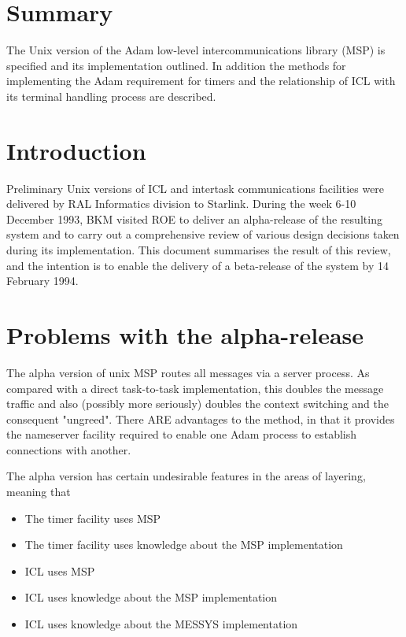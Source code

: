 \section {Summary}

The Unix version of the Adam low-level intercommunications library (MSP) 
is specified and its implementation outlined. In addition the methods 
for implementing the Adam requirement for timers and the relationship of 
ICL with its terminal handling process are described.


\section {Introduction}

Preliminary Unix versions of ICL and intertask communications facilities 
were delivered by RAL Informatics division to Starlink. During the week 
6-10 December 1993, BKM visited ROE to deliver an alpha-release of the 
resulting system and to carry out a comprehensive review of various 
design decisions taken during its implementation. This document 
summarises the result of this review, and the intention is to enable the 
delivery of a beta-release of the system by 14 February 1994.

\section {Problems with the alpha-release}

The alpha version of unix MSP routes all messages via a server process. 
As compared with a direct task-to-task implementation, this doubles the
message traffic and also (possibly more seriously) doubles the context 
switching and the consequent "ungreed". There ARE advantages to the 
method, in that it provides the nameserver facility required to enable 
one Adam process to establish connections with another.

The alpha version has certain undesirable features in the areas of 
layering, meaning that

\begin{itemize}
\item The timer facility uses MSP
\item The timer facility uses knowledge about the MSP implementation
\item ICL uses MSP
\item ICL uses knowledge about the MSP implementation
\item ICL uses knowledge about the MESSYS implementation
\end{itemize}


